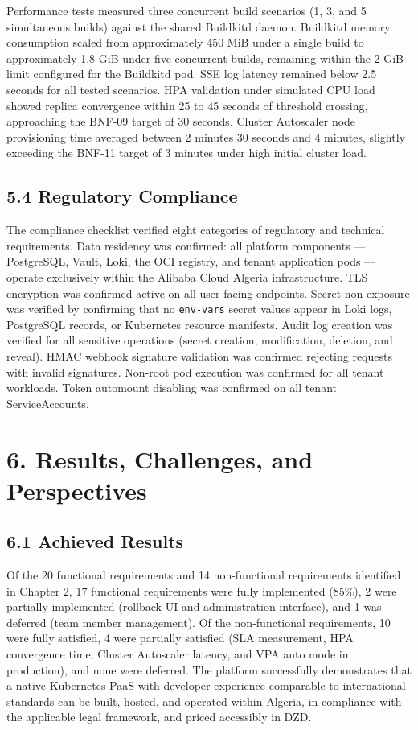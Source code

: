 Performance tests measured three concurrent build scenarios (1, 3, and 5 simultaneous builds) against the shared Buildkitd daemon. Buildkitd memory consumption scaled from approximately 450 MiB under a single build to approximately 1.8 GiB under five concurrent builds, remaining within the 2 GiB limit configured for the Buildkitd pod. SSE log latency remained below 2.5 seconds for all tested scenarios. HPA validation under simulated CPU load showed replica convergence within 25 to 45 seconds of threshold crossing, approaching the BNF-09 target of 30 seconds. Cluster Autoscaler node provisioning time averaged between 2 minutes 30 seconds and 4 minutes, slightly exceeding the BNF-11 target of 3 minutes under high initial cluster load.

\subsection*{5.4 Regulatory Compliance}

The compliance checklist verified eight categories of regulatory and technical requirements. Data residency was confirmed: all platform components — PostgreSQL, Vault, Loki, the OCI registry, and tenant application pods — operate exclusively within the Alibaba Cloud Algeria infrastructure. TLS encryption was confirmed active on all user-facing endpoints. Secret non-exposure was verified by confirming that no \texttt{env-vars} secret values appear in Loki logs, PostgreSQL records, or Kubernetes resource manifests. Audit log creation was verified for all sensitive operations (secret creation, modification, deletion, and reveal). HMAC webhook signature validation was confirmed rejecting requests with invalid signatures. Non-root pod execution was confirmed for all tenant workloads. Token automount disabling was confirmed on all tenant ServiceAccounts.

\section*{6. Results, Challenges, and Perspectives}

\subsection*{6.1 Achieved Results}

Of the 20 functional requirements and 14 non-functional requirements identified in Chapter 2, 17 functional requirements were fully implemented (85\%), 2 were partially implemented (rollback UI and administration interface), and 1 was deferred (team member management). Of the non-functional requirements, 10 were fully satisfied, 4 were partially satisfied (SLA measurement, HPA convergence time, Cluster Autoscaler latency, and VPA auto mode in production), and none were deferred. The platform successfully demonstrates that a native Kubernetes PaaS with developer experience comparable to international standards can be built, hosted, and operated within Algeria, in compliance with the applicable legal framework, and priced accessibly in DZD.

